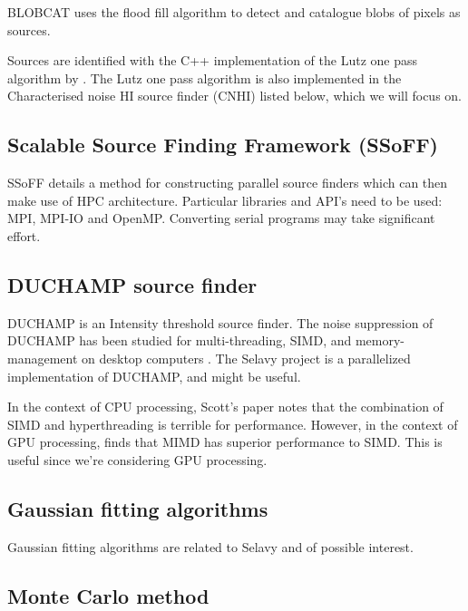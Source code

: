 \documentclass[prodmode,acmtecs]{acmsmall} %
\begin{document}
BLOBCAT \cite{hales2012blobcat} uses the flood fill algorithm to detect and catalogue blobs of pixels
as sources.

Sources are identified with the C++ implementation of the Lutz one pass algorithm \cite{lutz1980algorithm}
by \cite{jurek2012characterised}. The Lutz one pass algorithm is also implemented in the Characterised
noise HI source finder (CNHI) listed below, which we will focus on.

\subsection{Scalable Source Finding Framework (SSoFF)}

SSoFF details a method for constructing parallel source finders which can then make use of HPC architecture.
Particular libraries and API's need to be used: MPI, MPI-IO and OpenMP. Converting serial programs
may take significant effort.

\subsection{DUCHAMP source finder}

DUCHAMP \cite{whiting2012duchamp} is an Intensity threshold source finder.
The noise suppression of DUCHAMP has been studied for multi-threading,
SIMD, and memory-management on desktop computers \cite{scottBadenhorst}. The Selavy project
\cite{whiting2012source} is a parallelized implementation of DUCHAMP, and might be useful.

In the context of CPU processing, Scott's paper \cite{scottBadenhorst} notes that the combination of SIMD and hyperthreading
is terrible for performance. However, in the context of GPU processing, \cite{mahesri2008tradeoffs}
finds that MIMD has superior performance to SIMD. This is useful since we're considering GPU processing.


\subsection{Gaussian fitting algorithms}

Gaussian fitting algorithms \cite{hancock2012compact} are related to Selavy and of possible interest.

\subsection{Monte Carlo method}
\end{document}
